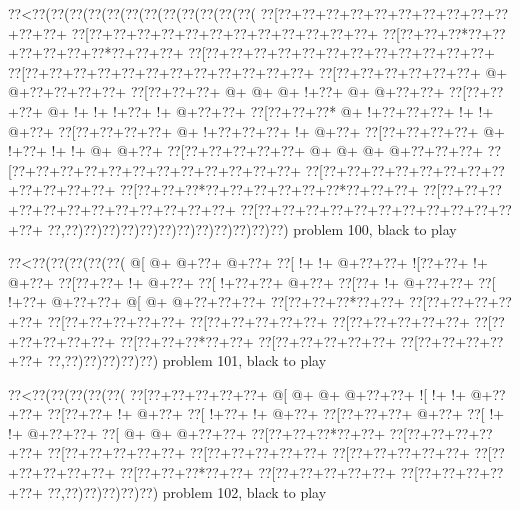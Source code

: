 \vbox{\vbox{\goo
\0??<\0??(\0??(\0??(\0??(\0??(\0??(\0??(\0??(\0??(\0??(\0??(\0??(
\0??[\0??+\0??+\0??+\0??+\0??+\0??+\0??+\0??+\0??+\0??+\0??+\0??+
\0??[\0??+\0??+\0??+\0??+\0??+\0??+\0??+\0??+\0??+\0??+\0??+\0??+
\0??[\0??+\0??+\0??*\0??+\0??+\0??+\0??+\0??+\0??*\0??+\0??+\0??+
\0??[\0??+\0??+\0??+\0??+\0??+\0??+\0??+\0??+\0??+\0??+\0??+\0??+
\0??[\0??+\0??+\0??+\0??+\0??+\0??+\0??+\0??+\0??+\0??+\0??+\0??+
\0??[\0??+\0??+\0??+\0??+\0??+\0??+\- @+\- @+\0??+\0??+\0??+\0??+
\0??[\0??+\0??+\0??+\- @+\- @+\- @+\- !+\0??+\- @+\- @+\0??+\0??+
\0??[\0??+\0??+\0??+\- @+\- !+\- !+\- !+\0??+\- !+\- @+\0??+\0??+
\0??[\0??+\0??+\0??*\- @+\- !+\0??+\0??+\0??+\- !+\- !+\- @+\0??+
\0??[\0??+\0??+\0??+\0??+\- @+\- !+\0??+\0??+\0??+\- !+\- @+\0??+
\0??[\0??+\0??+\0??+\0??+\- @+\- !+\0??+\- !+\- !+\- @+\- @+\0??+
\0??[\0??+\0??+\0??+\0??+\0??+\- @+\- @+\- @+\- @+\0??+\0??+\0??+
\0??[\0??+\0??+\0??+\0??+\0??+\0??+\0??+\0??+\0??+\0??+\0??+\0??+
\0??[\0??+\0??+\0??+\0??+\0??+\0??+\0??+\0??+\0??+\0??+\0??+\0??+
\0??[\0??+\0??+\0??*\0??+\0??+\0??+\0??+\0??+\0??*\0??+\0??+\0??+
\0??[\0??+\0??+\0??+\0??+\0??+\0??+\0??+\0??+\0??+\0??+\0??+\0??+
\0??[\0??+\0??+\0??+\0??+\0??+\0??+\0??+\0??+\0??+\0??+\0??+\0??+
\0??,\0??)\0??)\0??)\0??)\0??)\0??)\0??)\0??)\0??)\0??)\0??)\0??)
}
\hfil problem 100, black to play\hfil\break
}

\vbox{\vbox{\goo
\0??<\0??(\0??(\0??(\0??(\0??(
\- @[\- @+\- @+\0??+\- @+\0??+
\0??[\- !+\- !+\- @+\0??+\0??+
\- ![\0??+\0??+\- !+\- @+\0??+
\0??[\0??+\0??+\- !+\- @+\0??+
\0??[\- !+\0??+\0??+\- @+\0??+
\0??[\0??+\- !+\- @+\0??+\0??+
\0??[\- !+\0??+\- @+\0??+\0??+
\- @[\- @+\- @+\0??+\0??+\0??+
\0??[\0??+\0??+\0??*\0??+\0??+
\0??[\0??+\0??+\0??+\0??+\0??+
\0??[\0??+\0??+\0??+\0??+\0??+
\0??[\0??+\0??+\0??+\0??+\0??+
\0??[\0??+\0??+\0??+\0??+\0??+
\0??[\0??+\0??+\0??+\0??+\0??+
\0??[\0??+\0??+\0??*\0??+\0??+
\0??[\0??+\0??+\0??+\0??+\0??+
\0??[\0??+\0??+\0??+\0??+\0??+
\0??,\0??)\0??)\0??)\0??)\0??)
}
\hfil problem 101, black to play\hfil\break
}

\vbox{\vbox{\goo
\0??<\0??(\0??(\0??(\0??(\0??(
\0??[\0??+\0??+\0??+\0??+\0??+
\- @[\- @+\- @+\- @+\0??+\0??+
\- ![\- !+\- !+\- @+\0??+\0??+
\0??[\0??+\0??+\- !+\- @+\0??+
\0??[\- !+\0??+\- !+\- @+\0??+
\0??[\0??+\0??+\0??+\- @+\0??+
\0??[\- !+\- !+\- @+\0??+\0??+
\0??[\- @+\- @+\- @+\0??+\0??+
\0??[\0??+\0??+\0??*\0??+\0??+
\0??[\0??+\0??+\0??+\0??+\0??+
\0??[\0??+\0??+\0??+\0??+\0??+
\0??[\0??+\0??+\0??+\0??+\0??+
\0??[\0??+\0??+\0??+\0??+\0??+
\0??[\0??+\0??+\0??+\0??+\0??+
\0??[\0??+\0??+\0??*\0??+\0??+
\0??[\0??+\0??+\0??+\0??+\0??+
\0??[\0??+\0??+\0??+\0??+\0??+
\0??,\0??)\0??)\0??)\0??)\0??)
}
\hfil problem 102, black to play\hfil\break
}

